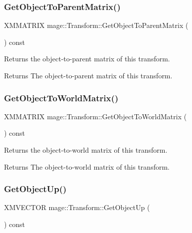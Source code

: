 \subsubsection{\texorpdfstring{Get\+Object\+To\+Parent\+Matrix()}{GetObjectToParentMatrix()}}
{\footnotesize\ttfamily X\+M\+M\+A\+T\+R\+IX mage\+::\+Transform\+::\+Get\+Object\+To\+Parent\+Matrix (\begin{DoxyParamCaption}{ }\end{DoxyParamCaption}) const}

Returns the object-\/to-\/parent matrix of this transform.

\begin{DoxyReturn}{Returns}
The object-\/to-\/parent matrix of this transform. 
\end{DoxyReturn}
\hypertarget{structmage_1_1_transform_a6fe97738bf9ae9d1e677c3e09b8c6d81}{}\label{structmage_1_1_transform_a6fe97738bf9ae9d1e677c3e09b8c6d81} 
\subsubsection{\texorpdfstring{Get\+Object\+To\+World\+Matrix()}{GetObjectToWorldMatrix()}}
{\footnotesize\ttfamily X\+M\+M\+A\+T\+R\+IX mage\+::\+Transform\+::\+Get\+Object\+To\+World\+Matrix (\begin{DoxyParamCaption}{ }\end{DoxyParamCaption}) const}

Returns the object-\/to-\/world matrix of this transform.

\begin{DoxyReturn}{Returns}
The object-\/to-\/world matrix of this transform. 
\end{DoxyReturn}
\hypertarget{structmage_1_1_transform_a68a9a599104b976b01aea39cc8ab03d2}{}\label{structmage_1_1_transform_a68a9a599104b976b01aea39cc8ab03d2} 
\subsubsection{\texorpdfstring{Get\+Object\+Up()}{GetObjectUp()}}
{\footnotesize\ttfamily X\+M\+V\+E\+C\+T\+OR mage\+::\+Transform\+::\+Get\+Object\+Up (\begin{DoxyParamCaption}{ }\end{DoxyParamCaption}) const}

